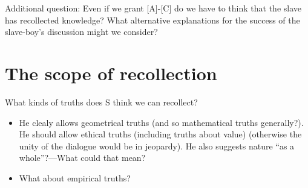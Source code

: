 \documentclass[11pt]{article}
\begin{document}
\noindent Additional question: Even if we grant [A]-[C] do we have to think that the slave has recollected knowledge? What alternative explanations for the success of the slave-boy's discussion might we consider?

\section*{The scope of recollection}

\noindent What kinds of truths does S think we can recollect?

\begin{itemize}\item{He clealy allows geometrical truths (and so mathematical truths generally?). He should allow ethical truths (including truths about value) (otherwise the unity of the dialogue would be in jeopardy). He also suggests nature ``as a whole''?---What could that mean?}\item{What about empirical truths?}\end{itemize}
\end{document}
